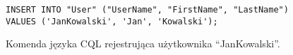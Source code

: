 \begin{figure}[!ht]
\begin{verbatim}
INSERT INTO "User" ("UserName", "FirstName", "LastName")
VALUES ('JanKowalski', 'Jan', 'Kowalski');
\end{verbatim}

\caption{Komenda języka CQL rejestrująca użytkownika ``JanKowalski''.}
\label{fig:cql:insert}
\end{figure}
